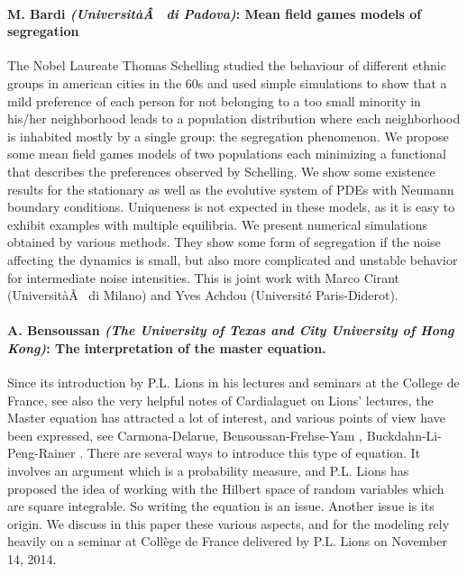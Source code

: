 \documentclass[11pt]{article}
\begin{document}
\paragraph{ M. Bardi {\sl (Universit{\`a}{\^A}  di Padova)}:  Mean field games models of segregation}
The Nobel Laureate Thomas Schelling studied the behaviour of 
different ethnic groups in american cities in the 60s and used simple 
simulations to show that a mild preference of each person for not 
belonging to a too small minority in his/her neighborhood leads to a 
population distribution where each neighborhood is inhabited mostly by a
 single group: the segregation phenomenon. We propose some mean field 
games models of two populations each minimizing a functional that 
describes the preferences observed by Schelling. We show some existence 
results for the stationary as well as the evolutive system of PDEs with 
Neumann boundary conditions. Uniqueness is not expected in these models,
 as it is easy to exhibit examples with multiple equilibria. We present 
numerical simulations obtained by various methods.  They show some form 
of segregation if the noise affecting the dynamics is small, but also 
more complicated and unstable behavior for intermediate noise 
intensities.
This is joint work with Marco Cirant (Universit{\`a}{\^A}  di Milano) and Yves 
Achdou (Universit{\'e} Paris-Diderot).

\paragraph{ A. Bensoussan   {\sl  (The University of Texas   and  City University of Hong Kong)}:
    The interpretation of the master equation.}
 Since its introduction by P.L. Lions in his lectures and seminars at the
    College de France, see also the very helpful notes of Cardialaguet on
    Lions' lectures, the Master equation has attracted a lot of interest, and
    various points of view have been expressed, see Carmona-Delarue,
    Bensoussan-Frehse-Yam , Buckdahn-Li-Peng-Rainer . There are several ways
    to introduce this type of equation. It involves an argument which is a
    probability measure, and P.L. Lions has proposed the idea of working with
    the Hilbert space of random variables which are square integrable. So
    writing the equation is an issue. Another issue is its origin. We discuss
    in this paper these various aspects, and for the modeling rely heavily on
    a seminar at Coll{\`e}ge de France delivered by P.L. Lions on November 14,
    2014.
\end{document}
